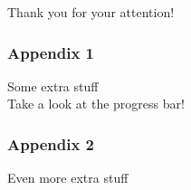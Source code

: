 \documentclass[mathserif, fleqn]{beamer}
\begin{document}
\begin{frame}[plain,c]
  \renewcommand*\item{\olditem[]}
  \begin{center}
    \textcolor{aiphired}{\LARGE Thank you for your attention!}
  \end{center}
\end{frame}

\appendix
\backupbegin

\begin{frame}\frametitle{Appendix 1}
  Some extra stuff\\[2ex]
  Take a look at the progress bar!
\end{frame}

\begin{frame}\frametitle{Appendix 2}
  Even more extra stuff
\end{frame}

\backupend
\end{document}
